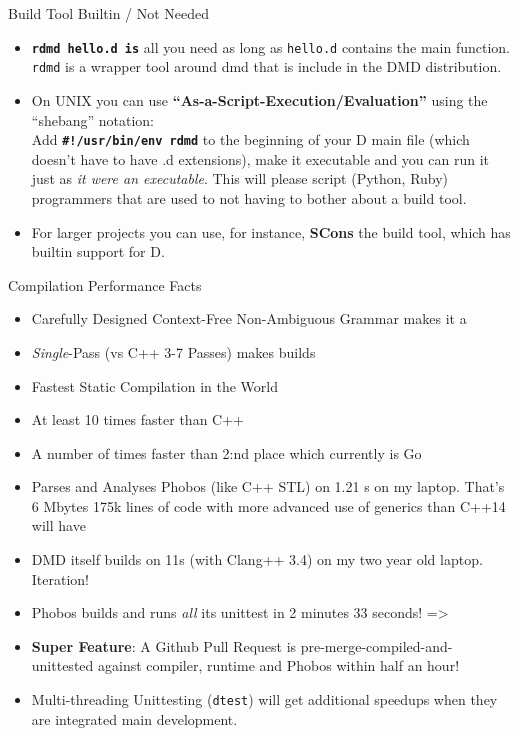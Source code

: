\documentclass[xcolor=dvipsnames]{beamer}
\begin{document}
\begin{frame}[fragile]{Build Tool Builtin / Not Needed}
  \begin{itemize}[<+->]
  \item \textbf{\texttt{rdmd hello.d is}} all you need as long as
    \texttt{hello.d} contains the main function. \texttt{rdmd} is a wrapper tool
    around dmd that is include in the DMD distribution.
  \item On UNIX you can use \textbf{“As-a-Script-Execution/Evaluation”} using
    the ``shebang'' notation:\\Add \textbf{\textbf{\texttt{\#!/usr/bin/env
          rdmd}}} to the beginning of your D main file (which doesn't have to
    have .d extensions), make it executable and you can run it just as
    \textit{it were an executable}. This will please script (Python, Ruby)
    programmers that are used to not having to bother about a build tool.
  \item For larger projects you can use, for instance, \textbf{SCons} the build
    tool, which has builtin support for D.
  \end{itemize}
\end{frame}

\begin{frame}[fragile]{Compilation Performance Facts}
  \begin{itemize}[<+->]
  \item Carefully Designed Context-Free Non-Ambiguous Grammar makes it a
  \item \emph{Single}-Pass (vs C++ 3-7 Passes) makes builds
  \item Fastest Static Compilation in the World
  \item At least 10 times faster than C++
  \item A number of times faster than 2:nd place which currently is Go
  \item Parses and Analyses Phobos (like C++ STL) on 1.21 s on my laptop. That’s 6 Mbytes
    175k lines of code with more advanced use of generics than C++14 will have
  \item DMD itself builds on 11s (with Clang++ 3.4) on my two year old laptop. Iteration!
  \item Phobos builds and runs \emph{all} its unittest in 2 minutes 33 seconds! =>
  \item \textbf{Super Feature}: A Github Pull Request is
    pre-merge-compiled-and-unittested against compiler, runtime and Phobos
    within half an hour!
  \item Multi-threading Unittesting (\texttt{dtest}) will get additional
    speedups when they are integrated main development.
  \end{itemize}
\end{frame}
\end{document}
